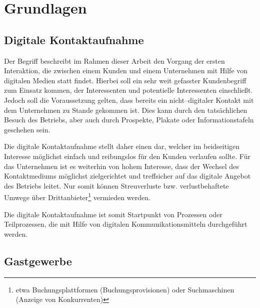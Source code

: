 \section{Grundlagen}
\label{sec:grundlagen}

\subsection{Digitale Kontaktaufnahme}

Der Begriff  beschreibt im Rahmen dieser Arbeit den Vorgang der ersten Interaktion, die zwischen einem Kunden und einem Unternehmen mit Hilfe von digitalen Medien statt findet. Hierbei soll ein sehr weit gefasster Kundenbegriff zum Einsatz kommen, der Interessenten und potentielle Interessenten einschließt. Jedoch soll die Voraussetzung gelten, dass bereits ein nicht--digitaler Kontakt mit dem Unternehmen zu Stande gekommen ist. Dies kann durch den tatsächlichen Besuch des Betriebs, aber auch durch Prospekte, Plakate oder Informationstafeln geschehen sein.

Die digitale Kontaktaufnahme stellt daher einen  dar, welcher im beidseitigen Interesse möglichst einfach und reibungslos für den Kunden verlaufen sollte. Für das Unternehmen ist es weiterhin von hohem Interesse, dass der Wechsel des Kontaktmediums möglichst zielgerichtet und treffsicher auf das digitale Angebot des Betriebs leitet. Nur somit können Streuverluste bzw. verlustbehaftete Umwege über Drittanbieter\footnote{etwa Buchungsplattformen (Buchungsprovisionen) oder Suchmaschinen (Anzeige von Konkurrenten)} vermieden werden.

Die digitale Kontaktaufnahme ist somit Startpunkt von Prozessen oder Teilprozessen, die mit Hilfe von digitalen Kommunikationsmitteln durchgeführt werden.

\subsection{Gastgewerbe}


